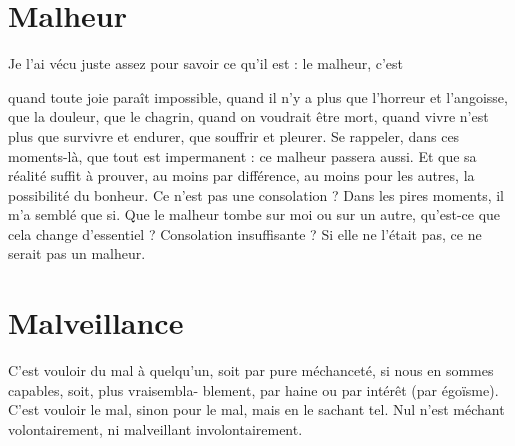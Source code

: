 \section{Malheur}
Je l'ai vécu juste assez pour savoir ce qu’il est : le malheur, c’est

quand toute joie paraît impossible, quand il n’y a plus que
l'horreur et l'angoisse, que la douleur, que le chagrin, quand on voudrait être
mort, quand vivre n’est plus que survivre et endurer, que souffrir et pleurer.
Se rappeler, dans ces moments-là, que tout est impermanent : ce malheur passera
aussi. Et que sa réalité suffit à prouver, au moins par différence, au moins
pour les autres, la possibilité du bonheur. Ce n’est pas une consolation ? Dans
les pires moments, il m’a semblé que si. Que le malheur tombe sur moi ou sur
un autre, qu'est-ce que cela change d’essentiel ? Consolation insuffisante ? Si
elle ne l'était pas, ce ne serait pas un malheur.

\section{Malveillance}
C'est vouloir du mal à quelqu'un, soit par pure méchanceté,
si nous en sommes capables, soit, plus vraisembla-
blement, par haine ou par intérêt (par égoïsme). C’est vouloir le mal, sinon
pour le mal, mais en le sachant tel. Nul n’est méchant volontairement, ni malveillant
involontairement.

